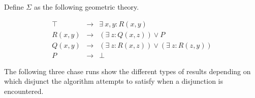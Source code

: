 		Define $\Sigma$ as the following geometric theory.

		\begin{eqnarray}
			\label{eqn:chase1}
			\top    &  \to  &  \exists\ x,y : R(x,y)                             \\
			\label{eqn:chase2}
			R(x,y)  &  \to  &  (\exists\ z : Q(x,z)) \vee P                      \\
			\label{eqn:chase3}
			Q(x,y)  &  \to  &  (\exists\ z : R(x,z)) \vee (\exists\ z : R(z,y))  \\
			\label{eqn:chase4}
			P       &  \to  &  \bot
		\end{eqnarray}

		The following three chase runs show the different types of results
		depending on which disjunct the algorithm attempts to satisfy when a
		disjunction is encountered.

